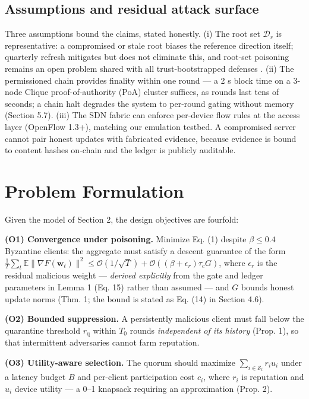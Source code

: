 \documentclass[cmc,article,submit,moreauthors,pdftex]{Definitions/tsp}
\begin{document}
\subsection{Assumptions and residual attack surface}\label{sec:assumptions-and-residual-attack-surface}

Three assumptions bound the claims, stated honestly. (i) The root set $\mathcal{D}_r$ is representative: a compromised or stale root biases the reference direction itself; quarterly refresh mitigates but does not eliminate this, and root-set poisoning remains an open problem shared with all trust-bootstrapped defenses \cite{ref-37}. (ii) The permissioned chain provides finality within one round --- a 2 s block time on a 3-node Clique proof-of-authority (PoA) cluster suffices, as rounds last tens of seconds; a chain halt degrades the system to per-round gating without memory (Section 5.7). (iii) The SDN fabric can enforce per-device flow rules at the access layer (OpenFlow 1.3+), matching our emulation testbed. A compromised server cannot pair honest updates with fabricated evidence, because evidence is bound to content hashes on-chain and the ledger is publicly auditable.

\section{Problem Formulation}\label{sec:problem-formulation}

Given the model of Section 2, the design objectives are fourfold:

\textbf{(O1) Convergence under poisoning.} Minimize Eq. (1) despite $\beta \le 0.4$ Byzantine clients: the aggregate must satisfy a descent guarantee of the form $\frac{1}{T}\sum_t \mathbb{E}\|\nabla F(\mathbf{w}_t)\|^2 \le \mathcal{O}(1/\sqrt{T}) + \mathcal{O}((\beta + \epsilon_r)\tau_c G)$, where $\epsilon_r$ is the residual malicious weight --- \emph{derived explicitly} from the gate and ledger parameters in Lemma 1 (Eq. 15) rather than assumed --- and $G$ bounds honest update norms (Thm. 1; the bound is stated as Eq. (14) in Section 4.6).

\textbf{(O2) Bounded suppression.} A persistently malicious client must fall below the quarantine threshold $r_{\mathrm{q}}$ within $T_0$ rounds \emph{independent of its history} (Prop. 1), so that intermittent adversaries cannot farm reputation.

\textbf{(O3) Utility-aware selection.} The quorum should maximize $\sum_{i\in\mathcal{S}_t} r_i u_i$ under a latency budget $B$ and per-client participation cost $c_i$, where $r_i$ is reputation and $u_i$ device utility --- a 0--1 knapsack requiring an approximation (Prop. 2).
\end{document}
